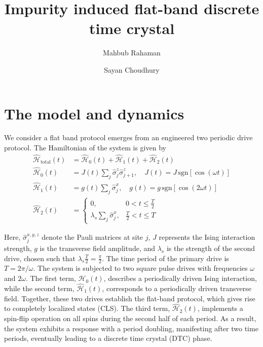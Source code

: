 \documentclass[a4paper,10pt]{article}
\title{Impurity induced flat-band discrete time crystal}
\author[1]{Mahbub Rahaman}
\author[1]{Sayan Choudhury}
\affil[1]{\small Harish-Chandra Research Institute, HBNI, Chhatnag Road, Jhunsi, Praygraj, UP - 211019, India}
\date{}
\begin{document}
\maketitle

\section{The model and dynamics}
We consider a flat band protocol emerges from an engineered two periodic drive protocol. The Hamiltonian of the system is given by
\begin{align}
    \hat{\mathcal{H}}_{\text{total}}(t) &=  \hat{\mathcal{H}}_0(t) + \hat{\mathcal{H}}_1(t)  + \hat{\mathcal{H}}_2(t) \\
    \hat{\mathcal{H}}_0(t) &= J(t)\sum_{j} \hat{\sigma}_j^z \hat{\sigma}_{j+1}^z, \quad J(t) = J\, \mathrm{sgn}[\cos(\omega t)] \\
    \hat{\mathcal{H}}_1(t) &= g(t)\sum_{j}\hat{\sigma}_j^x, \quad g(t) = g\, \mathrm{sgn}[\cos(2 \omega t)] \\
    \hat{\mathcal{H}}_2(t) &=
    \begin{cases}
        0, & 0 < t \leq \frac{T}{2} \\
        \lambda_s \sum_{j}\hat{\sigma}_j^x, & \frac{T}{2} < t \leq T
    \end{cases}
\end{align}

Here, $\hat{\sigma}_j^{x,y,z}$ denote the Pauli matrices at site $j$, $J$ represents the Ising interaction strength, $g$ is the transverse field amplitude, and $\lambda_s$ is the strength of the second drive, chosen such that $\lambda_s \frac{T}{2} = \frac{\pi}{2}$. The time period of the primary drive is $T = 2\pi/\omega$. The system is subjected to two square pulse drives with frequencies $\omega$ and $2\omega$. The first term, $\hat{\mathcal{H}}_0(t)$, describes a periodically driven Ising interaction, while the second term, $\hat{\mathcal{H}}_1(t)$, corresponds to a periodically driven transverse field. Together, these two drives establish the flat-band protocol, which gives rise to completely localized states (CLS). The third term, $\hat{\mathcal{H}}_2(t)$, implements a spin-flip operation on all spins during the second half of each period. As a result, the system exhibits a response with a period doubling, manifesting after two time periods, eventually leading to a discrete time crystal (DTC) phase.




\printbibliography{}
\end{document}
